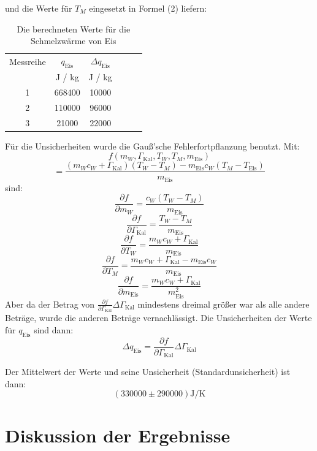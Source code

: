 \documentclass[11pt,a4paper]{article} %
\begin{document}
und die Werte für $T_M$ eingesetzt in Formel (2) liefern:

\begin{table}[h]
	\centering
	\begin{tabular*}{0.99\textwidth}{@{\extracolsep{\fill}}cccccc}
		\toprule
		Messreihe & $q_\textrm{Eis}$ & $\Delta q_\textrm{Eis}$  \\
		& J / kg & J / kg \\
		1 & 668400 & 10000  \\
		2 & 110000 & 96000 \\
		3 & 21000 & 22000 \\
		\bottomrule
	\end{tabular*}
	\caption{Die berechneten Werte für die Schmelzwärme von Eis}
	\label{tabelle4}
\end{table}

\begin{tcolorbox}[colback=white]
Für die Unsicherheiten wurde die Gauß'sche Fehlerfortpflanzung benutzt. Mit:
$$f(m_W,\Gamma_\textrm{Kal},T_W, T_M, m_\textrm{Eis}) $$ 
$$ = \frac{(m_W c_W + \Gamma_\textrm{Kal})(T_W - T_M) - m_\textrm{Eis} c_W(T_M - T_\textrm{Eis})}{m_\textrm{Eis}} $$
sind:
$$ \frac{\partial f}{\partial m_W} = \frac{c_W(T_W-T_M)}{m_\textrm{Eis}}$$
$$ \frac{\partial f}{\partial \Gamma_\textrm{Kal}} = \frac{T_W-T_M}{m_\textrm{Eis}}$$
$$ \frac{\partial f}{\partial T_W} = \frac{m_W c_W + \Gamma_\textrm{Kal}}{m_\textrm{Eis} }$$
$$ \frac{\partial f}{\partial T_M} = \frac{m_W c_W + \Gamma_\textrm{Kal} - m_\textrm{Eis} c_W}{m_\textrm{Eis}} $$
$$\frac{\partial f}{\partial m_\textrm{Eis}} = \frac{m_W c_W + \Gamma_\textrm{Kal}}{m_\textrm{Eis}^2}$$
Aber da der Betrag von $\frac{\partial f}{\partial \Gamma_\textrm{Kal}} \Delta \Gamma_\textrm{Kal}$ mindestens dreimal größer war als alle andere Beträge, wurde die anderen Beträge vernachlässigt. 
Die Unsicherheiten der Werte für $q_\textrm{Eis}$ sind dann:
$$\Delta q_\textrm{Eis} = \frac{\partial f}{\partial \Gamma_\textrm{Kal}} \Delta \Gamma_\textrm{Kal} $$


\end{tcolorbox}

Der Mittelwert der Werte und seine Unsicherheit (Standardunsicherheit) ist dann:
$$(330000 \pm 290000) \textrm{J/K}$$

\section{Diskussion der Ergebnisse}
\end{document}
